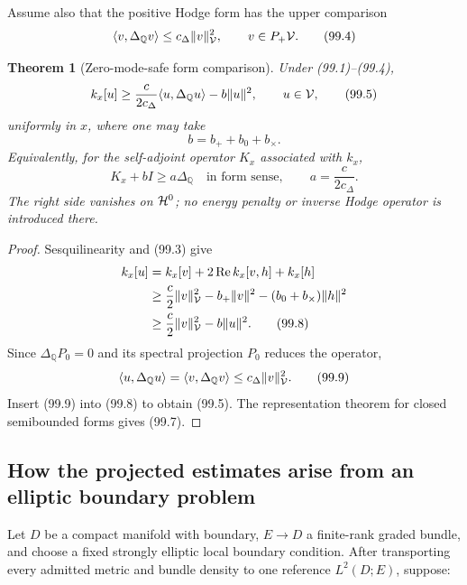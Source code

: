 \documentclass[11pt]{article}
\newtheorem{theorem}{Theorem}[section]
\theoremstyle{remark}
\begin{document}
Assume also that the positive Hodge form has the upper comparison
\[
 \langle v,\Delta_{\mathbb Q}v\rangle
 \leq c_\Delta\|v\|_{\cal V}^2,
 \qquad v\in P_+{\cal V}.                                      \tag{99.4}
\]

\begin{theorem}[Zero-mode-safe form comparison]
\label{thm:v12v99-comparison}
Under (99.1)--(99.4),
\[
 k_x[u]\geq
 \frac{c}{2c_\Delta}
 \langle u,\Delta_{\mathbb Q}u\rangle
 -b\|u\|^2,\qquad u\in{\cal V},                                \tag{99.5}
\]
uniformly in \(x\), where one may take
\[
 b=b_++b_0+b_\times.                                            \tag{99.6}
\]
Equivalently, for the self-adjoint operator \(K_x\) associated with
\(k_x\),
\[
 K_x+bI\geq a\Delta_{\mathbb Q}
 \quad\text{in form sense},\qquad
 a=\frac{c}{2c_\Delta}.                                         \tag{99.7}
\]
The right side vanishes on \({\cal H}^0\); no energy penalty or
inverse Hodge operator is introduced there.
\end{theorem}

\begin{proof}
Sesquilinearity and (99.3) give
\[
\begin{split}
 k_x[u]
 &=k_x[v]+2\operatorname{Re}k_x[v,h]+k_x[h]\\
 &\geq
 \frac c2\|v\|_{\cal V}^2
 -b_+\|v\|^2-(b_0+b_\times)\|h\|^2\\
 &\geq
 \frac c2\|v\|_{\cal V}^2-b\|u\|^2.                            \tag{99.8}
\end{split}
\]
Since \(\Delta_{\mathbb Q}P_0=0\) and its spectral projection
\(P_0\) reduces the operator,
\[
 \langle u,\Delta_{\mathbb Q}u\rangle
 =\langle v,\Delta_{\mathbb Q}v\rangle
 \leq c_\Delta\|v\|_{\cal V}^2.                                \tag{99.9}
\]
Insert (99.9) into (99.8) to obtain (99.5).  The representation
theorem for closed semibounded forms gives (99.7).
\end{proof}

\subsection{How the projected estimates arise from an elliptic
boundary problem}

Let \(D\) be a compact manifold with boundary, \(E\to D\) a
finite-rank graded bundle, and choose a fixed strongly elliptic local
boundary condition.  After transporting every admitted metric and
bundle density to one reference \(L^2(D;E)\), suppose:
\end{document}
